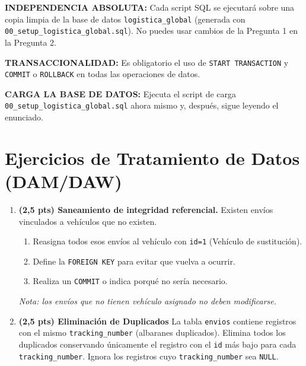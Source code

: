 \documentclass[a4paper,11pt]{article}
\begin{document}
\begin{Form}
\begin{tcolorbox}[colframe=alert, title=INSTRUCCIONES CRÍTICAS]
\textbf{INDEPENDENCIA ABSOLUTA:} Cada script SQL se ejecutará sobre una copia limpia de la base de datos \texttt{logistica\_global} (generada con \texttt{00\_setup\_logistica\_global.sql}). No puedes usar cambios de la Pregunta 1 en la Pregunta 2.
\par\medskip
\textbf{TRANSACCIONALIDAD:} Es obligatorio el uso de \texttt{START TRANSACTION} y \texttt{COMMIT} o \texttt{ROLLBACK} en todas las operaciones de datos.
\par\medskip
\textbf{CARGA LA BASE DE DATOS:} Ejecuta el script de carga \texttt{00\_setup\_logistica\_global.sql} ahora mismo y, después, sigue leyendo el enunciado.
\end{tcolorbox}

\section{Ejercicios de Tratamiento de Datos (DAM/DAW)}

\begin{enumerate}[leftmargin=*, label=\textbf{Pregunta \arabic*:}]



    \item \textbf{(2,5 pts) Saneamiento de integridad referencial.}
   Existen envíos vinculados a vehículos que no existen.
    \begin{enumerate}
        \item Reasigna todos esos envíos al vehículo con \texttt{id=1} (Vehículo de sustitución).
        \item Define la \texttt{FOREIGN KEY} para evitar que vuelva a ocurrir.
        \item Realiza un \texttt{COMMIT} o indica porqué no sería necesario.
    \end{enumerate}

    \textit{Nota: los envíos que no tienen vehículo asignado no deben modificarse.}


    \item \textbf{(2,5 pts) Eliminación de Duplicados}
    La tabla \texttt{envios} contiene registros con el mismo \texttt{tracking\_number} (albaranes duplicados). Elimina todos los duplicados conservando únicamente el registro con el \texttt{id} más bajo para cada \texttt{tracking\_number}. Ignora los registros cuyo \texttt{tracking\_number} sea \texttt{NULL}.
    \medskip


\end{enumerate}
\end{Form}
\end{document}
